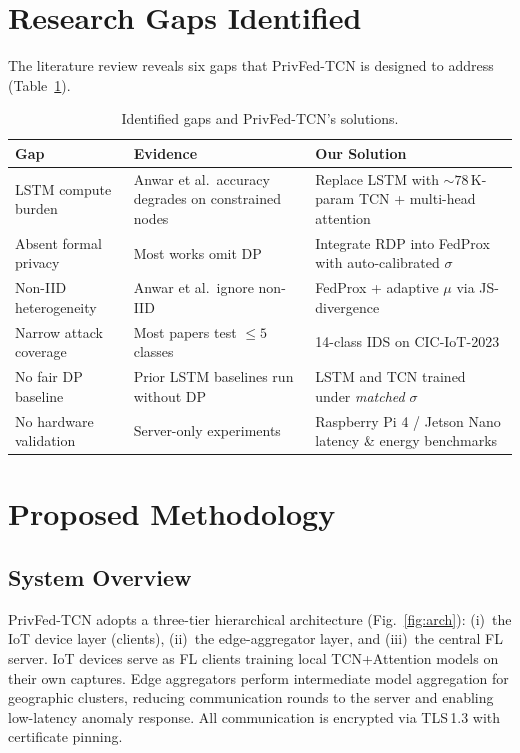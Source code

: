\documentclass[conference]{IEEEtran}
\begin{document}
\section{Research Gaps Identified}\label{sec:gaps}
The literature review reveals six gaps that PrivFed-TCN is designed to
address (Table~\ref{tab:gaps}).

\begin{table}[t]
\centering
\caption{Identified gaps and PrivFed-TCN's solutions.}
\label{tab:gaps}
\renewcommand{\arraystretch}{1.15}
\begin{tabular}{p{} p{} p{}}
\toprule
\textbf{Gap} & \textbf{Evidence} & \textbf{Our Solution} \\
\midrule
LSTM compute burden & Anwar et al.\ accuracy degrades on
constrained nodes & Replace LSTM with $\sim 78$\,K-param TCN +
multi-head attention \\
Absent formal privacy & Most works omit DP & Integrate RDP into
FedProx with auto-calibrated $\sigma$ \\
Non-IID heterogeneity & Anwar et al.\ ignore non-IID & FedProx +
adaptive $\mu$ via JS-divergence \\
Narrow attack coverage & Most papers test $\le 5$ classes &
14-class IDS on CIC-IoT-2023 \\
No fair DP baseline & Prior LSTM baselines run without DP &
LSTM and TCN trained under \emph{matched} $\sigma$ \\
No hardware validation & Server-only experiments &
Raspberry Pi 4 / Jetson Nano latency \& energy benchmarks \\
\bottomrule
\end{tabular}
\end{table}

\section{Proposed Methodology}\label{sec:methodology}

\subsection{System Overview}
PrivFed-TCN adopts a three-tier hierarchical architecture
(Fig.~\ref{fig:arch}): (i)~the IoT device layer (clients), (ii)~the
edge-aggregator layer, and (iii)~the central FL server. IoT devices
serve as FL clients training local TCN+Attention models on their own
captures. Edge aggregators perform intermediate model aggregation for
geographic clusters, reducing communication rounds to the server and
enabling low-latency anomaly response. All communication is encrypted
via TLS\,1.3 with certificate pinning.
\end{document}
